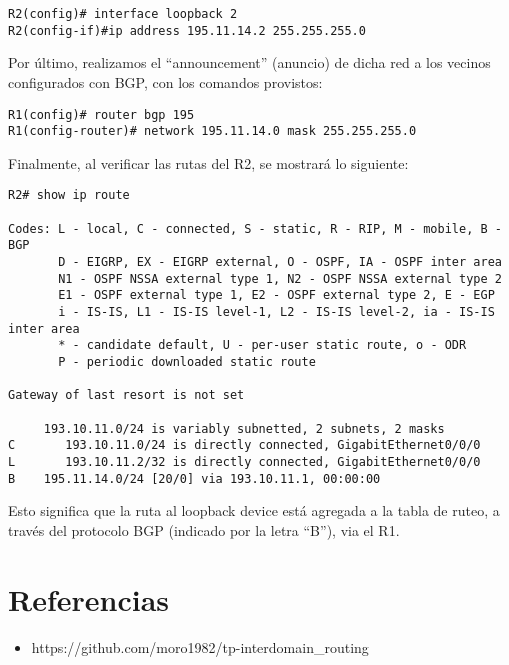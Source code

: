 \documentclass{article}
\begin{document}
\begin{verbatim}
R2(config)# interface loopback 2
R2(config-if)#ip address 195.11.14.2 255.255.255.0
\end{verbatim}

Por \'ultimo, realizamos el ``announcement'' (anuncio) de dicha red a los vecinos configurados con BGP, con los comandos provistos:

\begin{verbatim}
R1(config)# router bgp 195
R1(config-router)# network 195.11.14.0 mask 255.255.255.0

\end{verbatim}

Finalmente, al verificar las rutas del R2, se mostrar\'a lo siguiente: \\

\begin{verbatim}
R2# show ip route

Codes: L - local, C - connected, S - static, R - RIP, M - mobile, B - BGP
       D - EIGRP, EX - EIGRP external, O - OSPF, IA - OSPF inter area
       N1 - OSPF NSSA external type 1, N2 - OSPF NSSA external type 2
       E1 - OSPF external type 1, E2 - OSPF external type 2, E - EGP
       i - IS-IS, L1 - IS-IS level-1, L2 - IS-IS level-2, ia - IS-IS inter area
       * - candidate default, U - per-user static route, o - ODR
       P - periodic downloaded static route

Gateway of last resort is not set

     193.10.11.0/24 is variably subnetted, 2 subnets, 2 masks
C       193.10.11.0/24 is directly connected, GigabitEthernet0/0/0
L       193.10.11.2/32 is directly connected, GigabitEthernet0/0/0
B    195.11.14.0/24 [20/0] via 193.10.11.1, 00:00:00

\end{verbatim}

Esto significa que la ruta al loopback device est\'a agregada a la tabla de ruteo, a trav\'es del protocolo BGP (indicado por la letra ``B''), via el R1. \\

\section{Referencias}
\begin{itemize}
    \item https://github.com/moro1982/tp-interdomain\_routing
\end{itemize}
\end{document}

